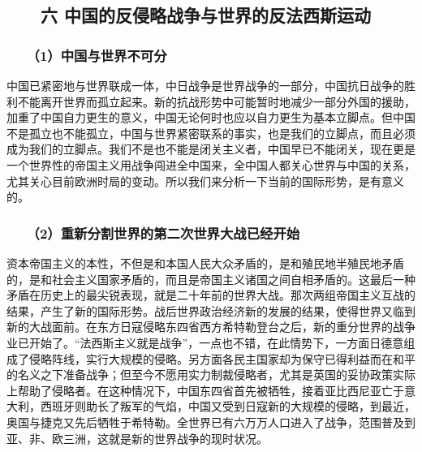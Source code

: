 \documentclass[cn,11pt,chinese]{elegantbook}
\def\myformat#1{\hfil\hfil #1}
\begin{document}
\subsection*{\myformat{　　六 中国的反侵略战争与世界的反法西斯运动}}
\subsubsection*{\myformat{　　（1）中国与世界不可分}}
中国已紧密地与世界联成一体，中日战争是世界战争的一部分，中国抗日战争的胜利不能离开世界而孤立起来。新的抗战形势中可能暂时地减少一部分外国的援助，加重了中国自力更生的意义，中国无论何时也应以自力更生为基本立脚点。但中国不是孤立也不能孤立，中国与世界紧密联系的事实，也是我们的立脚点，而且必须成为我们的立脚点。我们不是也不能是闭关主义者，中国早已不能闭关，现在更是一个世界性的帝国主义用战争闯进全中国来，全中国人都关心世界与中国的关系，尤其关心目前欧洲时局的变动。所以我们来分析一下当前的国际形势，是有意义的。\\
\subsubsection*{\myformat{　　（2）重新分割世界的第二次世界大战已经开始}}
资本帝国主义的本性，不但是和本国人民大众矛盾的，是和殖民地半殖民地矛盾的，是和社会主义国家矛盾的，而且是帝国主义诸国之间自相矛盾的。这最后一种矛盾在历史上的最尖锐表现，就是二十年前的世界大战。那次两组帝国主义互战的结果，产生了新的国际形势。战后世界政治经济新的发展的结果，使得世界又临到新的大战面前。在东方日寇侵略东四省西方希特勒登台之后，新的重分世界的战争业已开始了。“法西斯主义就是战争”，一点也不错，在此情势下，一方面日德意组成了侵略阵线，实行大规模的侵略。另方面各民主国家却为保守已得利益而在和平的名义之下准备战争；但至今不愿用实力制裁侵略者，尤其是英国的妥协政策实际上帮助了侵略者。在这种情况下，中国东四省首先被牺牲，接着亚比西尼亚亡于意大利，西班牙则助长了叛军的气焰，中国又受到日寇新的大规模的侵略，到最近，奥国与捷克又先后牺牲于希特勒。全世界已有六万万人口进入了战争，范围普及到亚、非、欧三洲，这就是新的世界战争的现时状况。\\
\end{document}

